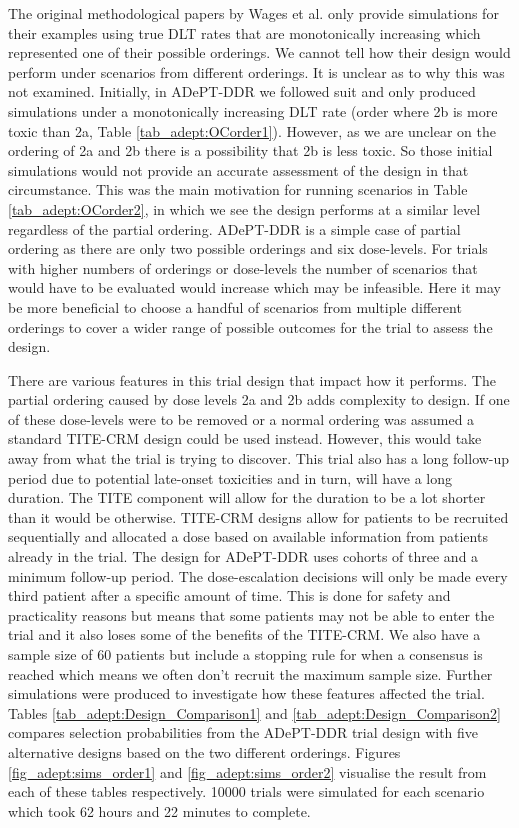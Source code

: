The original methodological papers by Wages et al. \cite{wagesUsingTimetoeventContinual2013,wagesContinualReassessmentMethod2011} only provide simulations for their examples using true DLT rates that are monotonically increasing which represented one of their possible orderings. We cannot tell how their design would perform under scenarios from different orderings. It is unclear as to why this was not examined. Initially, in ADePT-DDR we followed suit and only produced simulations under a monotonically increasing DLT rate (order where 2b is more toxic than 2a, Table \ref{tab_adept:OCorder1}). However, as we are unclear on the ordering of 2a and 2b there is a possibility that 2b is less toxic. So those initial simulations would not provide an accurate assessment of the design in that circumstance. This was the main motivation for running scenarios in Table \ref{tab_adept:OCorder2}, in which we see the design performs at a similar level regardless of the partial ordering. ADePT-DDR is a simple case of partial ordering as there are only two possible orderings and six dose-levels. For trials with higher numbers of orderings or dose-levels the number of scenarios that would have to be evaluated would increase which may be infeasible. Here it may be more beneficial to choose a handful of scenarios from multiple different orderings to cover a wider range of possible outcomes for the trial to assess the design. 

There are various features in this trial design that impact how it performs. The partial ordering caused by dose levels 2a and 2b adds complexity to design. If one of these dose-levels were to be removed or a normal ordering was assumed a standard TITE-CRM design could be used instead. However, this would take away from what the trial is trying to discover. This trial also has a long follow-up period due to potential late-onset toxicities and in turn, will have a long duration. The TITE component will allow for the duration to be a lot shorter than it would be otherwise. TITE-CRM designs allow for patients to be recruited sequentially and allocated a dose based on available information from patients already in the trial. The design for ADePT-DDR uses cohorts of three and a minimum follow-up period. The dose-escalation decisions will only be made every third patient after a specific amount of time. This is done for safety and practicality reasons but means that some patients may not be able to enter the trial and it also loses some of the benefits of the TITE-CRM. We also have a sample size of 60 patients but include a stopping rule for when a consensus is reached which means we often don't recruit the maximum sample size. Further simulations were produced to investigate how these features affected the trial. Tables \ref{tab_adept:Design_Comparison1} and \ref{tab_adept:Design_Comparison2} compares selection probabilities from the ADePT-DDR trial design with five alternative designs based on the two different orderings. Figures \ref{fig_adept:sims_order1} and \ref{fig_adept:sims_order2} visualise the result from each of these tables respectively. 10000 trials were simulated for each scenario which took 62 hours and 22 minutes to complete.  
 
